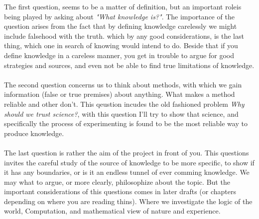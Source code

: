 \documentclass[9pt,a4paper,twocolumn]{article}
\newcounter{def}
\begin{document}
            \indent The first question, seems to be a matter of definition, but an important roleis being played by asking about \textit{"What knowledge is?"}. The importance of the question arises from the fact that by defining knowledge carelessly we might include falsehood with the truth. which by any good considerations, is the last thing, which one in search of knowing would intend to do. Beside that if you define knowledge in a careless manner, you get in trouble to argue for good strategies and sources, and even not be able to find true limitations of knowledge.
            \\
            \\
            \indent The second question concerns us to think about methods, with which we gain information (false or true premises) about anything. What makes a method reliable and other don't. This qeustion incudes the old fashioned problem \textit{Why should we trust science?}, with this question I'll try to show that science, and specifically the process of experimenting is found to be the most reliable way to produce knowledge.
            \\
            \\
            \indent The last question is rather the aim of the project in front of you. This questions invites the careful study of the source of knowledge to be more specific, to show if it has any boundaries, or is it an endless tunnel of ever comming knowledge. We may what to argue, or more clearly, philosophize about the topic. But the important considerations of this questions comes in later drafts (or chapters depending on where you are reading thins). Where we investigate the logic of the world, Computation, and mathematical view of nature and experience.
        
\end{document}
